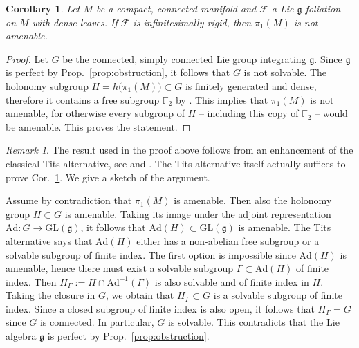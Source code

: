 \documentclass[11pt, letterpaper, oneside,reqno]{amsart}
\theoremstyle{plain}
\newtheorem{cor}[thm]{Corollary}
\theoremstyle{underline}
\theoremstyle{definition}
\theoremstyle{remark}
\newtheorem{remark}[thm]{Remark}
\begin{document}
	\begin{cor}\label{cor:not-amenable}
		Let $M$ be a compact, connected manifold and $\mathcal{F}$ a Lie $\mathfrak{g}$-foliation on $M$ with dense leaves. If $\mathcal{F}$ is infinitesimally rigid, then $\pi_1(M)$ is not amenable.
	\end{cor}
	\begin{proof}
		Let $G$ be the connected, simply connected Lie group integrating $\mathfrak{g}$. Since $\mathfrak{g}$ is perfect by Prop.~\ref{prop:obstruction}, it follows that $G$ is not solvable. The holonomy subgroup $H=h\big(\pi_1(M)\big)\subset G$ is finitely generated and dense, therefore it contains a free subgroup $\mathbb{F}_{2}$ by \cite[Thm.~1.3]{Breuillard}. This implies that $\pi_1(M)$ is not amenable, for otherwise every subgroup of $H$ -- including this copy of $\mathbb{F}_2$ -- would be amenable. This proves the statement.
	\end{proof}
	
	\begin{remark}
		The result \cite[Thm.~1.3]{Breuillard} used in the proof above follows from an enhancement of the classical Tits alternative, see \cite[Thm.~4.5]{Breuillard} and \cite[Rem.~4.6]{Breuillard}. The Tits alternative itself actually suffices to prove Cor.~\ref{cor:not-amenable}. We give a sketch of the argument.
		
		Assume by contradiction that $\pi_1(M)$ is amenable. Then also the holonomy group $H\subset G$ is amenable. Taking its image under the adjoint representation $\text{Ad}:G\rightarrow\text{GL}(\mathfrak{g})$, it follows that $\text{Ad}(H)\subset\text{GL}(\mathfrak{g})$ is amenable. The Tits alternative \cite[Thm.~1]{Tits} says that $\text{Ad}(H)$ either has a non-abelian free subgroup or a solvable subgroup of finite index. The first option is impossible since $\text{Ad}(H)$ is amenable, hence there must exist a solvable subgroup $\Gamma\subset\text{Ad}(H)$ of finite index. Then  $H_{\Gamma}:=H\cap\text{Ad}^{-1}(\Gamma)$ is also solvable and of finite index in $H$. Taking the closure in $G$, we obtain  that $\overline{H_{\Gamma}}\subset G$ is a solvable subgroup of finite index. Since a closed subgroup of finite index is also open, it follows that $\overline{H_{\Gamma}}=G$ since $G$ is connected. In particular, $G$ is solvable. This contradicts that the Lie algebra $\mathfrak{g}$ is perfect by Prop.~\ref{prop:obstruction}.
	\end{remark}
	
	
\end{document}
